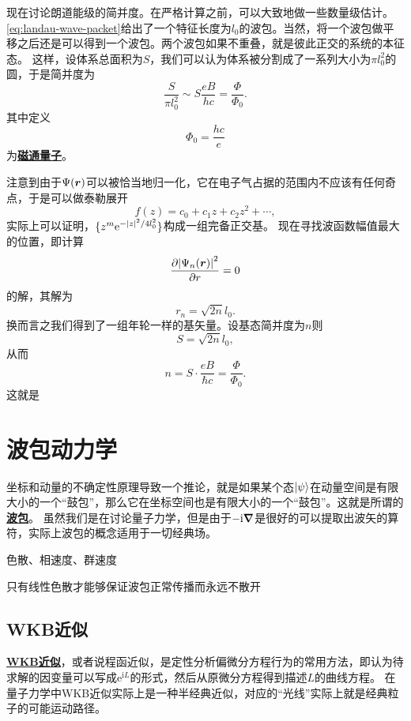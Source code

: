 \documentclass[UTF8, a4paper]{ctexart}
\newcommand*{\ee}{\mathrm{e}}
\newcommand*{\ii}{\mathrm{i}}
\newcommand{\concept}[1]{\underline{\textbf{#1}}}
\begin{document}
现在讨论朗道能级的简并度。在严格计算之前，可以大致地做一些数量级估计。
\eqref{eq:landau-wave-packet}给出了一个特征长度为$l_0$的波包。当然，将一个波包做平移之后还是可以得到一个波包。两个波包如果不重叠，就是彼此正交的系统的本征态。
这样，设体系总面积为$S$，我们可以认为体系被分割成了一系列大小为$\pi l_0^2$的圆，于是简并度为
\[
    \frac{S}{\pi l_0^2} \sim S \frac{eB}{h c} = \frac{\Phi}{\Phi_0}.
\]
其中定义
\begin{equation}
    \Phi_0 = \frac{h c}{e}
\end{equation}
为\concept{磁通量子}。

注意到由于$\Psi(\vb*{r})$可以被恰当地归一化，它在电子气占据的范围内不应该有任何奇点，于是可以做泰勒展开
\[
    f(z) = c_0 + c_1 z + c_2 z^2 + \cdots,
\]
实际上可以证明，$\{z^m \ee^{- \abs{z}^2 / 4 l_0^2}\}$构成一组完备正交基。
现在寻找波函数幅值最大的位置，即计算
\[
    \pdv{\abs{\Psi_n(\vb*{r})}^2}{r} = 0
\]
的解，其解为
\[
    r_n = \sqrt{2n} l_0.
\]
换而言之我们得到了一组年轮一样的基矢量。设基态简并度为$n$则
\[
    S = \sqrt{2n} l_0,
\]
从而
\[
    n = S \cdot \frac{eB}{\hbar c} = \frac{\Phi}{\Phi_0}.
\]
这就是

\section{波包动力学}

坐标和动量的不确定性原理导致一个推论，就是如果某个态$\ket{\psi}$在动量空间是有限大小的一个“鼓包”，那么它在坐标空间也是有限大小的一个“鼓包”。这就是所谓的\concept{波包}。
虽然我们是在讨论量子力学，但是由于$- \ii \grad$是很好的可以提取出波矢的算符，实际上波包的概念适用于一切经典场。

色散、相速度、群速度

只有线性色散才能够保证波包正常传播而永远不散开

\subsection{WKB近似}

\concept{WKB近似}，或者说程函近似，是定性分析偏微分方程行为的常用方法，即认为待求解的因变量可以写成$\ee^{\ii L}$的形式，然后从原微分方程得到描述$L$的曲线方程。
在量子力学中WKB近似实际上是一种半经典近似，对应的“光线”实际上就是经典粒子的可能运动路径。
\end{document}
